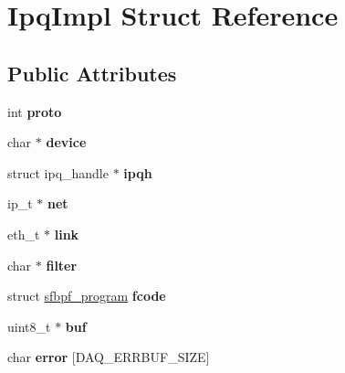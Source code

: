 \hypertarget{struct_ipq_impl}{
\section{IpqImpl Struct Reference}
\label{struct_ipq_impl}
}
\subsection*{Public Attributes}
\begin{DoxyCompactItemize}
\item 
\hypertarget{struct_ipq_impl_a127b5fd2a8ee5d1ea9c814dc746f2ef1}{
int {\bfseries proto}}
\label{struct_ipq_impl_a127b5fd2a8ee5d1ea9c814dc746f2ef1}

\item 
\hypertarget{struct_ipq_impl_a034de11d6debe9e5a6a756a71b40ddf1}{
char $\ast$ {\bfseries device}}
\label{struct_ipq_impl_a034de11d6debe9e5a6a756a71b40ddf1}

\item 
\hypertarget{struct_ipq_impl_aa65a1ffef9b4637e5cd61f75ee41a0af}{
struct ipq\_\-handle $\ast$ {\bfseries ipqh}}
\label{struct_ipq_impl_aa65a1ffef9b4637e5cd61f75ee41a0af}

\item 
\hypertarget{struct_ipq_impl_a1fe31a0921f1dc0e88aad8c712f84ad1}{
ip\_\-t $\ast$ {\bfseries net}}
\label{struct_ipq_impl_a1fe31a0921f1dc0e88aad8c712f84ad1}

\item 
\hypertarget{struct_ipq_impl_ab19a3e51eb7a4ea579dd8c3b0cfb0093}{
eth\_\-t $\ast$ {\bfseries link}}
\label{struct_ipq_impl_ab19a3e51eb7a4ea579dd8c3b0cfb0093}

\item 
\hypertarget{struct_ipq_impl_aeae888720fabef8c339a1df2e767f2a4}{
char $\ast$ {\bfseries filter}}
\label{struct_ipq_impl_aeae888720fabef8c339a1df2e767f2a4}

\item 
\hypertarget{struct_ipq_impl_a64237031ead737ebe03b529327d9920b}{
struct \hyperlink{structsfbpf__program}{sfbpf\_\-program} {\bfseries fcode}}
\label{struct_ipq_impl_a64237031ead737ebe03b529327d9920b}

\item 
\hypertarget{struct_ipq_impl_a4b7a9c2788d7312ea160c4c09ea739fe}{
uint8\_\-t $\ast$ {\bfseries buf}}
\label{struct_ipq_impl_a4b7a9c2788d7312ea160c4c09ea739fe}

\item 
\hypertarget{struct_ipq_impl_a94add78b42ec1776d69481420320aed3}{
char {\bfseries error} \mbox{[}DAQ\_\-ERRBUF\_\-SIZE\mbox{]}}
\label{struct_ipq_impl_a94add78b42ec1776d69481420320aed3}


\end{DoxyCompactItemize}

